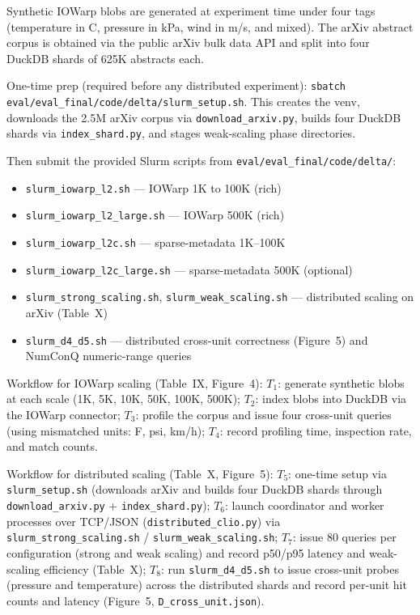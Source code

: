 \documentclass[conference]{IEEEtran}
\begin{document}

Synthetic IOWarp blobs are generated at experiment time under four tags (temperature in \textdegree C, pressure in kPa, wind in m/s, and mixed). The arXiv abstract corpus is obtained via the public arXiv bulk data API and split into four DuckDB shards of 625K abstracts each.


One-time prep (required before any distributed experiment): \texttt{sbatch eval/eval\_final/code/delta/slurm\_setup.sh}. This creates the venv, downloads the 2.5M arXiv corpus via \texttt{download\_arxiv.py}, builds four DuckDB shards via \texttt{index\_shard.py}, and stages weak-scaling phase directories.

Then submit the provided Slurm scripts from \texttt{eval/eval\_final/code/delta/}:
\begin{itemize}
\item \texttt{slurm\_iowarp\_l2.sh} --- IOWarp 1K to 100K (rich)
\item \texttt{slurm\_iowarp\_l2\_large.sh} --- IOWarp 500K (rich)
\item \texttt{slurm\_iowarp\_l2c.sh} --- sparse-metadata 1K--100K
\item \texttt{slurm\_iowarp\_l2c\_large.sh} --- sparse-metadata 500K (optional)
\item \texttt{slurm\_strong\_scaling.sh}, \texttt{slurm\_weak\_scaling.sh} --- distributed scaling on arXiv (Table~X)
\item \texttt{slurm\_d4\_d5.sh} --- distributed cross-unit correctness (Figure~5) and NumConQ numeric-range queries
\end{itemize}

\artcomp

Workflow for IOWarp scaling (Table~IX, Figure~4):
$T_1$: generate synthetic blobs at each scale (1K, 5K, 10K, 50K, 100K, 500K);
$T_2$: index blobs into DuckDB via the IOWarp connector;
$T_3$: profile the corpus and issue four cross-unit queries (using mismatched units: \textdegree F, psi, km/h);
$T_4$: record profiling time, inspection rate, and match counts.

Workflow for distributed scaling (Table~X, Figure~5):
$T_5$: one-time setup via \texttt{slurm\_setup.sh} (downloads arXiv and builds four DuckDB shards through \texttt{download\_arxiv.py} + \texttt{index\_shard.py});
$T_6$: launch coordinator and worker processes over TCP/JSON (\texttt{distributed\_clio.py}) via \texttt{slurm\_strong\_scaling.sh} / \texttt{slurm\_weak\_scaling.sh};
$T_7$: issue 80 queries per configuration (strong and weak scaling) and record p50/p95 latency and weak-scaling efficiency (Table~X);
$T_8$: run \texttt{slurm\_d4\_d5.sh} to issue cross-unit probes (pressure and temperature) across the distributed shards and record per-unit hit counts and latency (Figure~5, \texttt{D\_cross\_unit.json}).
\end{document}
